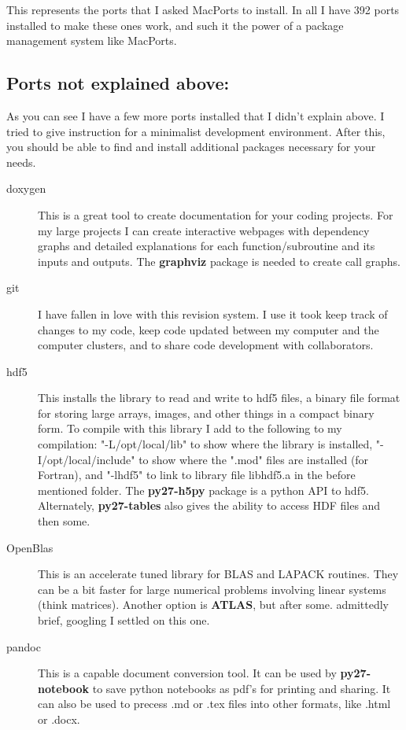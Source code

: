 \documentclass[11pt]{article}
\begin{document}
This represents the ports that I asked MacPorts to install. In all I have 392 ports installed to make these ones work, and such it the power of a package management system like MacPorts. 

\subsection*{Ports not explained above:}

As you can see I have a few more ports installed that I didn't explain above. I tried to give instruction for a minimalist development environment. After this, you should be able to find and install additional packages necessary for your needs.

\begin{description}
	\item[doxygen] This is a great tool to create documentation for your coding projects. For my large projects I can create interactive webpages with dependency graphs and detailed explanations for each function/subroutine and its inputs and outputs. The {\bf graphviz} package is needed to create call graphs.
	\item[git] I have fallen in love with this revision system. I use it took keep track of changes to my code, keep code updated between my computer and the computer clusters, and to share code development with collaborators.
	\item[hdf5] This installs the library to read and write to hdf5 files, a binary file format for storing large arrays, images, and other things in a compact binary form. To compile with this library I add to the following to my compilation: "-L/opt/local/lib" to show where the library is installed, "-I/opt/local/include" to show where the ".mod" files are installed (for Fortran), and "-lhdf5" to link to library file libhdf5.a in the before mentioned folder. The {\bf py27-h5py} package is a python API to hdf5. Alternately, {\bf py27-tables} also gives the ability to access HDF files and then some.
	\item[OpenBlas] This is an accelerate tuned library for BLAS and LAPACK routines. They can be a bit faster for large numerical problems involving linear systems (think matrices). Another option is {\bf ATLAS}, but after some. admittedly brief, googling I settled on this one. 
	\item[pandoc] This is a capable document conversion tool. It can be used by {\bf py27-notebook} to save python notebooks as pdf's for printing and sharing. It can also be used to precess .md or .tex files into other formats, like .html or .docx.

\end{description}
\end{document}
